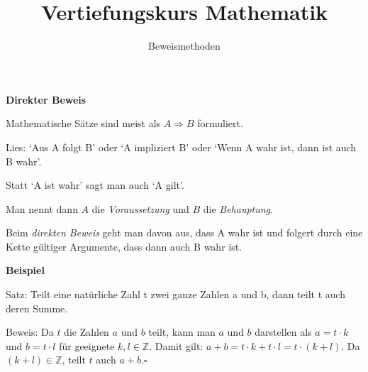 \usepackage[ngerman]{babel}
\usepackage[utf8]{inputenc}
\usepackage{amsmath}
\usepackage{amssymb}
\usepackage{listings} 
\usepackage{stmaryrd}
\lstset{language=Python, tabsize=4, showstringspaces=false,basicstyle=\footnotesize,mathescape=true} 
\usepackage{mathtools}
\usepackage{ulem}
\usepackage{tikz}

\parskip 10pt




\title{Vertiefungskurs Mathematik}   
\author{Beweismethoden} 
\date{}
\frame{\titlepage} 

\begin{frame}[fragile]

\textbf{Direkter Beweis}

Mathematische Sätze sind meist als $A \Rightarrow B$ formuliert.  

Lies: 
`Aus A folgt B' oder 
 `A impliziert B' oder `Wenn A wahr ist, dann ist auch B wahr'. 
 
 Statt  `A ist wahr' sagt man auch `A gilt'. \pause

Man nennt dann $A$ die \textit{Voraussetzung} und $B$ die \textit{Behauptung}. \pause

Beim \textit{direkten Beweis} geht man davon aus, dass A wahr ist und folgert durch eine
Kette gültiger Argumente, dass dann auch B wahr ist.
\end{frame}


\begin{frame}[fragile]

\textbf{Beispiel}
 
Satz: Teilt eine natürliche Zahl t zwei ganze Zahlen a und b, dann teilt t auch deren Summe. \pause

Beweis: Da $t$ die Zahlen $a$ und $b$ teilt, kann man $a$ und $b$ darstellen als $a = t \cdot k$ und
$b = t \cdot l$ für geeignete $k, l \in \mathbb{Z}$. \pause
Damit gilt: $a + b = t \cdot k + t \cdot l =  t \cdot (k + l)$. \pause
Da $(k+l) \in \mathbb{Z}$, teilt $t$ auch $a+b$.\hfill $\square$


\end{frame}


